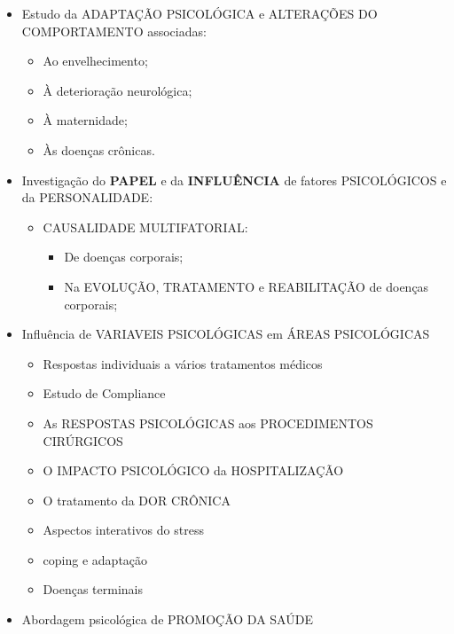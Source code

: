 \documentclass[
]{book}
\providecommand{\tightlist}{%
  \setlength{\itemsep}{0pt}\setlength{\parskip}{0pt}}
\begin{document}
\begin{itemize}
  \begin{itemize}
  \tightlist
  \item
    Estudo da ADAPTAÇÃO PSICOLÓGICA e ALTERAÇÕES DO COMPORTAMENTO
    associadas:

    \begin{itemize}
    \tightlist
    \item
      Ao envelhecimento;
    \item
      À deterioração neurológica;
    \item
      À maternidade;
    \item
      Às doenças crônicas.
    \end{itemize}
  \item
    Investigação do \textbf{PAPEL} e da \textbf{INFLUÊNCIA} de fatores
    PSICOLÓGICOS e da PERSONALIDADE:

    \begin{itemize}
    \tightlist
    \item
      CAUSALIDADE MULTIFATORIAL:

      \begin{itemize}
      \tightlist
      \item
        De doenças corporais;
      \item
        Na EVOLUÇÃO, TRATAMENTO e REABILITAÇÃO de doenças corporais;
      \end{itemize}
    \end{itemize}
  \item
    Influência de VARIAVEIS PSICOLÓGICAS em ÁREAS PSICOLÓGICAS

    \begin{itemize}
    \tightlist
    \item
      Respostas individuais a vários tratamentos médicos
    \item
      Estudo de Compliance
    \item
      As RESPOSTAS PSICOLÓGICAS aos PROCEDIMENTOS CIRÚRGICOS
    \item
      O IMPACTO PSICOLÓGICO da HOSPITALIZAÇÃO
    \item
      O tratamento da DOR CRÔNICA
    \item
      Aspectos interativos do stress
    \item
      coping e adaptação
    \item
      Doenças terminais
    \end{itemize}
  \item
    Abordagem psicológica de PROMOÇÃO DA SAÚDE


\end{itemize}
\end{itemize}
\end{document}
